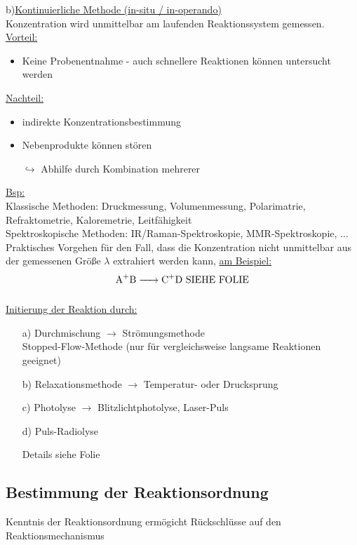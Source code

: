 \documentclass[a4paper, fleqn]{article}
\begin{document}
b)\underline{Kontinuierliche Methode (in-situ / in-operando)}\\
Konzentration wird unmittelbar am laufenden Reaktionssystem gemessen.\\
\underline{Vorteil:}\\
\begin{itemize}
    \item Keine Probenentnahme - auch schnellere Reaktionen können untersucht werden
\end{itemize}
\underline{Nachteil:}\\
\begin{itemize}
    \item indirekte Konzentrationsbestimmung
    \item Nebenprodukte können stören 
    \item[$\hookrightarrow$] Abhilfe durch Kombination mehrerer
\end{itemize}
\underline{Bsp:}\\
Klassische Methoden: Druckmessung, Volumenmessung, Polarimatrie, Refraktometrie, Kaloremetrie, Leitfähigkeit\\
Spektroskopische Methoden: IR/Raman-Spektroskopie, MMR-Spektroskopie, $\dots$\\
Praktisches Vorgehen für den Fall, dass die Konzentration nicht unmittelbar aus der gemessenen Größe $\lambda$ extrahiert werden kann, \underline{am Beispiel:}\\
\begin{equation*}
    \ce{A+B -> C+D} \text{ SIEHE FOLIE}
\end{equation*}\\
\underline{Initierung der Reaktion durch:}\\
\begin{itemize}
    \item[a)] Durchmischung $\rightarrow$ Strömungsmethode\\ Stopped-Flow-Methode (nur für vergleichsweise langsame Reaktionen geeignet)
    \item[b)] Relaxationsmethode $\rightarrow$ Temperatur- oder Drucksprung
    \item[c)] Photolyse $\rightarrow$ Blitzlichtphotolyse, Laser-Puls
    \item[d)] Puls-Radiolyse
    \item[] Details siehe Folie
\end{itemize}

\subsection{Bestimmung der Reaktionsordnung}
Kenntnis der Reaktionsordnung ermögicht Rückschlüsse auf den Reaktionsmechanismus
\end{document}
